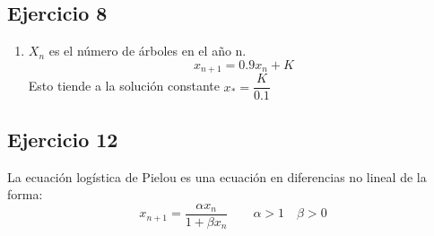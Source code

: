 \documentclass[11pt, a4paper, titlepage]{article}
\theoremstyle{theorem-style}
\theoremstyle{definition-style}
\theoremstyle{remark-style}
\theoremstyle{example-style}
\begin{document}
\subsection{Ejercicio 8}
\begin{enumerate}
	\item $X_n$ es el número de árboles en el año n.
	\[
	x _{n+1} = 0.9 x_n +K
	\]
	Esto tiende a la solución constante $x_* = \dfrac{K}{0.1}$
\end{enumerate}

\subsection{Ejercicio 12}
La ecuación logística de Pielou es una ecuación en diferencias no lineal de la forma:
\[
x_{n+1}= \frac{\alpha x_n}{1+ \beta x_n} \quad \quad \alpha > 1 \quad \beta > 0
\]
\end{document}
